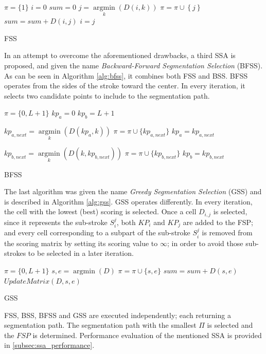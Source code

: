\documentclass[10pt, conference, compsocconf]{IEEEtran}
\begin{document}
\begin{algorithm}
$\pi = \{1\} $\;
$i=0$\;
$sum=0$\;
{
	$j = \mathop {\arg \min }\limits_k \left( {D\left( {i,k} \right)} \right)$\;
	$\pi = \pi \cup \left\{ j \right\}$\;
	$sum = sum + D\left( {i,j} \right)$\;
	$i=j$\;
}
\caption{FSS}
\label{alg:fss}
\end{algorithm}

In an attempt to overcome the aforementioned drawbacks, a third SSA is proposed, and given the name \emph{Backward-Forward Segmentation Selection} (BFSS). 
As can be seen in Algorithm \ref{alg:bfss}, it combines both FSS and BSS. 
BFSS operates from the sides of the stroke toward the center. In every iteration, it selects two candidate points to include to the segmentation path.\\

\begin{algorithm}
$\pi = \{0,L+1\}$\;
$kp_{a}=0$\;
$kp_{b}=L+1$\;
{
	$kp_{a,next} = \mathop {\arg \min}\limits_k (D(kp_a,k))$\;
	$\pi = \pi \cup \{kp_{a,next}\}$\;
	$kp_{a}=kp_{a,next}$\;
	
	$kp_{b,next} = \mathop {\arg \min}\limits_k (D(k,kp_{b,next}))$\;
	$\pi = \pi \cup \{kp_{b,next}\}$\;	
	$kp_{b}=kp_{b,next}$\;
}

\caption{BFSS}
\label{alg:bfss}
\end{algorithm}
  
The last algorithm was given the name \emph{Greedy Segmentation Selection} (GSS) and is described in Algorithm \ref{alg:gss}.
GSS operates differently. In every iteration, the cell with the lowest (best) scoring is selected. 
Once a cell $D_{i,j}$ is selected, since it represents the sub-stroke $S_{i}^{j}$, both $KP_{i}$ and $KP_{j}$ are added to the FSP; and every cell corresponding to a subpart of the sub-stroke $S_{i}^{j}$ is removed from the scoring matrix by setting its scoring value to $\infty$; in order to avoid those sub-strokes to be selected in a later iteration.\\

\begin{algorithm}
$\pi = \{0,L+1\}$\;
{
	${s,e} = \mathop {\arg \min}(D)$\;
	$\pi = \pi \cup \{s,e\}$\;
	$sum = sum + D(s,e)$\;
	$UpdateMatrix(D,s,e)$\;
}

\caption{GSS}
\label{alg:gss}
\end{algorithm}

FSS, BSS, BFSS and GSS are executed independently; each returning a segmentation path. The segmentation path with the smallest $\Pi$ is selected and the $FSP$ is determined. Performance evaluation of the mentioned SSA is provided in \ref{subsec:ssa_performance}. \\
\end{document}
